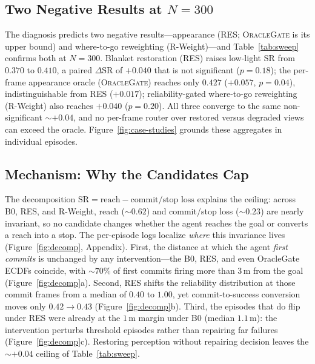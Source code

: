 \subsection{Two Negative Results at $N{=}300$}
The diagnosis predicts two negative results---appearance (RES;
\textsc{OracleGate} is its upper bound) and where-to-go reweighting
(R-Weight)---and Table~\ref{tab:sweep} confirms both at $N{=}300$. Blanket restoration (RES) raises low-light SR from
$0.370$ to $0.410$, a paired $\Delta$SR of $+0.040$ that is not significant
($p{=}0.18$); the per-frame appearance oracle (\textsc{OracleGate})
reaches only $0.427$ ($+0.057$, $p{=}0.04$), indistinguishable from RES
($+0.017$);
reliability-gated where-to-go reweighting (R-Weight) also reaches
$+0.040$ ($p{=}0.20$). All three converge to the same
non-significant ${\sim}{+}0.04$, and no per-frame router over restored
versus degraded views can exceed the oracle.
Figure~\ref{fig:case-studies} grounds these aggregates in individual
episodes.

\subsection{Mechanism: Why the Candidates Cap}
The decomposition $\text{SR}=\text{reach}-\text{commit/stop loss}$ explains
the ceiling: across B0, RES, and R-Weight, reach (${\sim}0.62$) and commit/stop
loss (${\sim}0.23$) are nearly invariant, so no candidate changes whether
the agent reaches the goal or converts a reach into a stop. The per-episode
logs localize \emph{where} this invariance lives
(Figure~\ref{fig:decomp}, Appendix). First, the distance at which the agent
\emph{first commits} is unchanged by any intervention---the B0, RES, and
even OracleGate ECDFs coincide, with ${\sim}70\%$ of first commits firing
more than $3$\,m from the goal (Figure~\ref{fig:decomp}a). Second, RES
shifts the reliability distribution at those commit frames from a median
of $0.40$ to $1.00$, yet commit-to-success conversion moves only
$0.42\to0.43$ (Figure~\ref{fig:decomp}b). Third, the episodes that do flip
under RES were already at the $1$\,m margin under B0 (median $1.1$\,m):
the intervention perturbs threshold episodes rather than repairing far
failures (Figure~\ref{fig:decomp}c). Restoring perception without
repairing decision leaves the ${\sim}{+}0.04$ ceiling of
Table~\ref{tab:sweep}.

